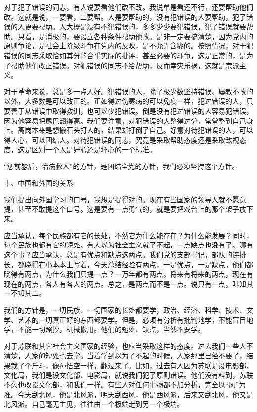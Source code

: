 \documentclass[UTF8, 12pt, a4paper]{ctexrep}
\begin{document}
对于犯了错误的同志，有人说要看他们改不改。我说单是看还不行，还要帮助他们改。这就是说，一要看，二要帮。人是要帮助的，没有犯错误的人要帮助，犯了错误的人更要帮助。人大概是没有不犯错误的，多多少少要犯错误，犯了错误就要帮助。只看，是消极的，要设立各种条件帮助他改。是非一定要搞清楚，因为党内的原则争论，是社会上阶级斗争在党内的反映，是不允许含糊的。按照情况，对于犯错误的同志采取恰如其分的合乎实际的批评，甚至必要的斗争，这是正常的，是为了帮助他们改正错误。对犯错误的同志不给帮助，反而幸灾乐祸，这就是宗派主义。

对于革命来说，总是多一点人好。犯错误的人，除了极少数坚持错误、屡教不改的以外，大多数是可以改正的。正如得过伤寒病的可以免疫一样，犯过错误的人，只要善于从错误中取得教训，也可以少犯错误。倒是没有犯过错误的人容易犯错误，因为他容易把尾巴翘得高。我们要注意，对犯错误的人整得过分，常常整到自己身上。高岗本来是想搬石头打人的，结果却打倒了自己。好意对待犯错误的人，可以得人心，可以团结人。对待犯错误的同志，究竟是采取帮助态度还是采取敌视态度，这是区别一个人是好心还是坏心的一个标准。

“惩前毖后，治病救人”的方针，是团结全党的方针，我们必须坚持这个方针。

十、中国和外国的关系

我们提出向外国学习的口号，我想是提得对的。现在有些国家的领导人就不愿意提，甚至不敢提这个口号。这是要有一点勇气的，就是要把戏台上的那个架子放下来。

应当承认，每个民族都有它的长处，不然它为什么能存在？为什么能发展？同时，每个民族也都有它的短处。有人以为社会主义就了不起，一点缺点也没有了。哪有这个事？应当承认，总是有优点和缺点这两点。我们党的支部书记，部队的连排长，都晓得在小本本上写着，今天总结经验有两点，一是优点，一是缺点。他们都晓得有两点，为什么我们只提一点？一万年都有两点。将来有将来的两点，现在有现在的两点，各人有各人的两点。总之，是两点而不是一点。说只有一点，叫知其一不知其二。

我们的方针是，一切民族、一切国家的长处都要学，政治、经济、科学、技术、文学、艺术的一切真正好的东西都要学。但是，必须有分析有批判地学，不能盲目地学，不能一切照抄，机械搬用。他们的短处、缺点，当然不要学。

对于苏联和其它社会主义国家的经验，也应当采取这样的态度。过去我们一些人不清楚，人家的短处也去学。当着学到以为了不起的时候，人家那里已经不要了，结果栽了个斤斗，像孙悟空一样，翻过来了。比如，过去有人因为苏联是设电影部、文化局，我们是设文化部、电影局，就说我们犯了原则错误。他们没有料到，苏联不久也改设文化部，和我们一样。有些人对任何事物都不加分析，完全以“风”为准。今天刮北风，他是北风派，明天刮西风，他是西风派，后来又刮北风，他又是北风派。自己毫无主见，往往由一个极端走到另一个极端。
\end{document}
